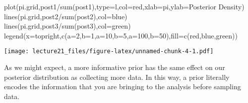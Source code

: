 \documentclass[
]{article}
\newenvironment{Shaded}{\begin{snugshade}}{\end{snugshade}}
\newcommand{\AttributeTok}[1]{\textcolor[rgb]{0.77,0.63,0.00}{#1}}
\newcommand{\FunctionTok}[1]{\textcolor[rgb]{0.00,0.00,0.00}{#1}}
\newcommand{\NormalTok}[1]{#1}
\newcommand{\SpecialCharTok}[1]{\textcolor[rgb]{0.00,0.00,0.00}{#1}}
\newcommand{\StringTok}[1]{\textcolor[rgb]{0.31,0.60,0.02}{#1}}
\begin{document}
\begin{Shaded}
\begin{Highlighting}[]
\FunctionTok{plot}\NormalTok{(pi.grid,post1}\SpecialCharTok{/}\FunctionTok{sum}\NormalTok{(post1),}\AttributeTok{type=}\StringTok{\textquotesingle{}l\textquotesingle{}}\NormalTok{,}\AttributeTok{col=}\StringTok{\textquotesingle{}red\textquotesingle{}}\NormalTok{,}\AttributeTok{xlab=}\StringTok{\textquotesingle{}pi\textquotesingle{}}\NormalTok{,}\AttributeTok{ylab=}\StringTok{\textquotesingle{}Posterior Density\textquotesingle{}}\NormalTok{)}
\FunctionTok{lines}\NormalTok{(pi.grid,post2}\SpecialCharTok{/}\FunctionTok{sum}\NormalTok{(post2),}\AttributeTok{col=}\StringTok{\textquotesingle{}blue\textquotesingle{}}\NormalTok{)}
\FunctionTok{lines}\NormalTok{(pi.grid,post3}\SpecialCharTok{/}\FunctionTok{sum}\NormalTok{(post3),}\AttributeTok{col=}\StringTok{\textquotesingle{}green\textquotesingle{}}\NormalTok{)}
\FunctionTok{legend}\NormalTok{(}\AttributeTok{x=}\StringTok{\textquotesingle{}topright\textquotesingle{}}\NormalTok{,}\FunctionTok{c}\NormalTok{(}\StringTok{\textquotesingle{}a=2,b=1\textquotesingle{}}\NormalTok{,}\StringTok{\textquotesingle{}a=10,b=5\textquotesingle{}}\NormalTok{,}\StringTok{\textquotesingle{}a=100,b=50\textquotesingle{}}\NormalTok{),}\AttributeTok{fill=}\FunctionTok{c}\NormalTok{(}\StringTok{\textquotesingle{}red\textquotesingle{}}\NormalTok{,}\StringTok{\textquotesingle{}blue\textquotesingle{}}\NormalTok{,}\StringTok{\textquotesingle{}green\textquotesingle{}}\NormalTok{))}
\end{Highlighting}
\end{Shaded}

\texttt{[image: lecture21\_files/figure-latex/unnamed-chunk-4-1.pdf]}

As we might expect, a more informative prior has the same effect on our
posterior distribution as collecting more data. In this way, a prior
literally encodes the information that you are bringing to the analysis
before sampling data.
\end{document}
